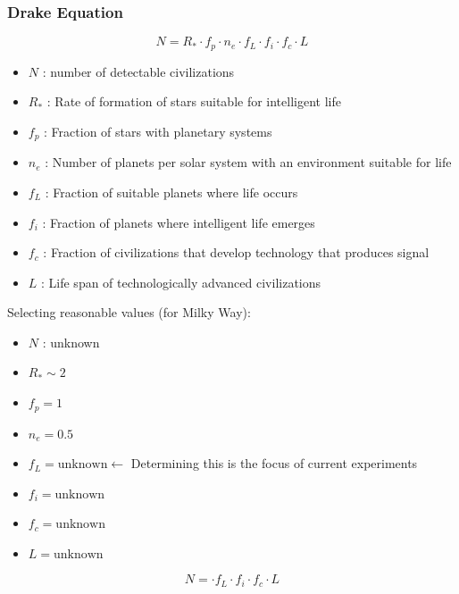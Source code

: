 \documentclass{beamer}
\begin{document}
\begin{frame}
\frametitle{Drake Equation}
$$ N = R_{*} \cdot f_{p} \cdot n_{e} \cdot f_{L} \cdot f_{i} \cdot f_{c} \cdot L$$
\begin{itemize}
    \item $N$ : number of detectable civilizations 
    \item $R_{*}$ : Rate of formation of stars suitable for intelligent life
    \item $f_{p}$ : Fraction of stars with planetary systems
    \item $n_{e}$ : Number of planets per solar system with an environment suitable for life
    \item $f_{L}$ : Fraction of suitable planets where life occurs
    \item $f_{i}$ : Fraction of planets where intelligent life emerges
    \item $f_{c}$ : Fraction of civilizations that develop technology that produces signal
    \item $L$     : Life span of technologically advanced civilizations
\end{itemize}
\pause
Selecting reasonable values (for Milky Way): 
\begin{itemize}
    \item $N$ : unknown
    \item $R_{*} \sim 2$
    \item $f_{p} = 1$
    \item $n_{e} = 0.5$ %
    \item $f_{L} = \text{unknown} \leftarrow $ Determining this is the focus of current experiments
    \item $f_{i} = \text{unknown}$
    \item $f_{c} = \text{unknown}$ 
    \item $L     = \text{unknown}$ 
\end{itemize}
$$ N = \cdot f_{L} \cdot f_{i} \cdot f_{c} \cdot L$$
\end{frame}

\end{document}
